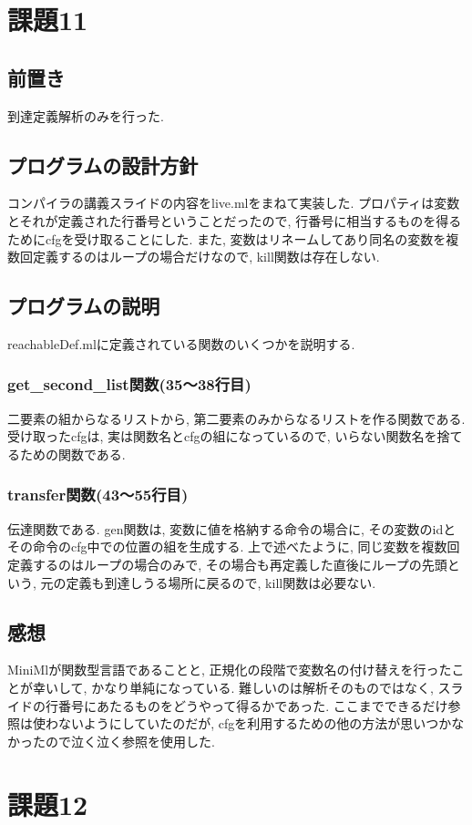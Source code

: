 \documentclass{jarticle}
\begin{document}
\section{課題11}
\subsection{前置き}
到達定義解析のみを行った. 
\subsection{プログラムの設計方針}
コンパイラの講義スライドの内容をlive.mlをまねて実装した. プロパティは変数とそれが定義された行番号ということだったので, 行番号に相当するものを得るためにcfgを受け取ることにした. また, 変数はリネームしてあり同名の変数を複数回定義するのはループの場合だけなので, kill関数は存在しない. 
\subsection{プログラムの説明}
reachableDef.mlに定義されている関数のいくつかを説明する.
\subsubsection{get\_second\_list関数(35～38行目)}
二要素の組からなるリストから, 第二要素のみからなるリストを作る関数である. 受け取ったcfgは, 実は関数名とcfgの組になっているので, いらない関数名を捨てるための関数である.
\subsubsection{transfer関数(43～55行目)}
伝達関数である. gen関数は, 変数に値を格納する命令の場合に, その変数のidとその命令のcfg中での位置の組を生成する. 上で述べたように, 同じ変数を複数回定義するのはループの場合のみで, その場合も再定義した直後にループの先頭という, 元の定義も到達しうる場所に戻るので, kill関数は必要ない.
\subsection{感想}
MiniMlが関数型言語であることと, 正規化の段階で変数名の付け替えを行ったことが幸いして, かなり単純になっている. 難しいのは解析そのものではなく, スライドの行番号にあたるものをどうやって得るかであった. ここまでできるだけ参照は使わないようにしていたのだが, cfgを利用するための他の方法が思いつかなかったので泣く泣く参照を使用した.

\section{課題12}
\end{document}
